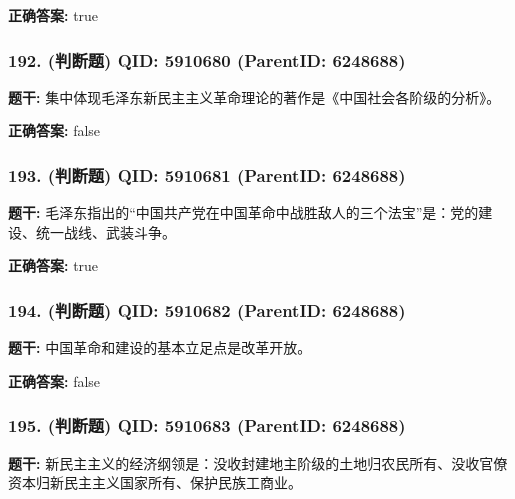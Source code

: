 \documentclass[12pt,UTF8]{ctexart}
\begin{document}
\textbf{正确答案:}
true

\vspace{0.3em}\hrulefill\vspace{0.7em}

\subsubsection*{192. (判断题) \small QID: 5910680 (ParentID: 6248688)}

\textbf{题干:}
集中体现毛泽东新民主主义革命理论的著作是《中国社会各阶级的分析》。



\textbf{正确答案:}
false

\vspace{0.3em}\hrulefill\vspace{0.7em}

\subsubsection*{193. (判断题) \small QID: 5910681 (ParentID: 6248688)}

\textbf{题干:}
毛泽东指出的“中国共产党在中国革命中战胜敌人的三个法宝”是：党的建设、统一战线、武装斗争。



\textbf{正确答案:}
true

\vspace{0.3em}\hrulefill\vspace{0.7em}

\subsubsection*{194. (判断题) \small QID: 5910682 (ParentID: 6248688)}

\textbf{题干:}
中国革命和建设的基本立足点是改革开放。



\textbf{正确答案:}
false

\vspace{0.3em}\hrulefill\vspace{0.7em}

\subsubsection*{195. (判断题) \small QID: 5910683 (ParentID: 6248688)}

\textbf{题干:}
新民主主义的经济纲领是：没收封建地主阶级的土地归农民所有、没收官僚资本归新民主主义国家所有、保护民族工商业。
\end{document}
